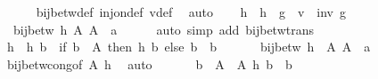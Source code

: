 \begin{isabellebody}
\ \ \ \ \isamarkupfalse%
\ bij{\isacharunderscore}{\kern0pt}betw{\isacharunderscore}{\kern0pt}def\ inj{\isacharunderscore}{\kern0pt}on{\isacharunderscore}{\kern0pt}def\ v{\isacharunderscore}{\kern0pt}def\ \isamarkupfalse%
\ auto\isanewline
\ \ \isamarkupfalse%
\ h{\isacharprime}{\kern0pt}\ \ {\isachardoublequoteopen}h{\isacharprime}{\kern0pt}\ {\isacharequal}{\kern0pt}\ g\ {\isasymcirc}\ v\ {\isasymcirc}\ {\isacharparenleft}{\kern0pt}inv\ g{\isacharparenright}{\kern0pt}{\isachardoublequoteclose}\isanewline
\ \ \isamarkupfalse%
\ {}\ {}\ {}\ \isamarkupfalse%
\ {}{\isacharcolon}{\kern0pt}\ {\isachardoublequoteopen}bij{\isacharunderscore}{\kern0pt}betw\ h{\isacharprime}{\kern0pt}\ A{\isacharprime}{\kern0pt}\ {\isacharparenleft}{\kern0pt}A{\isacharprime}{\kern0pt}\ {\isacharminus}{\kern0pt}\ {\isacharbraceleft}{\kern0pt}a{\isacharbraceright}{\kern0pt}{\isacharparenright}{\kern0pt}{\isachardoublequoteclose}\isanewline
\ \ \ \ \isamarkupfalse%
\ {\isacharparenleft}{\kern0pt}auto\ simp\ add{\isacharcolon}{\kern0pt}\ bij{\isacharunderscore}{\kern0pt}betw{\isacharunderscore}{\kern0pt}trans{\isacharparenright}{\kern0pt}\isanewline
\ \ \isamarkupfalse%
\ h\ \ {\isachardoublequoteopen}h\ b\ {\isacharequal}{\kern0pt}\ {\isacharparenleft}{\kern0pt}if\ b\ {\isasymin}\ A{\isacharprime}{\kern0pt}\ then\ h{\isacharprime}{\kern0pt}\ b\ else\ b{\isacharparenright}{\kern0pt}{\isachardoublequoteclose}\ \ b\isanewline
\ \ \isamarkupfalse%
\ {}\ \isamarkupfalse%
\ {\isachardoublequoteopen}bij{\isacharunderscore}{\kern0pt}betw\ h\ \ A{\isacharprime}{\kern0pt}\ {\isacharparenleft}{\kern0pt}A{\isacharprime}{\kern0pt}\ {\isacharminus}{\kern0pt}\ {\isacharbraceleft}{\kern0pt}a{\isacharbraceright}{\kern0pt}{\isacharparenright}{\kern0pt}{\isachardoublequoteclose}\isanewline
\ \ \ \ \isamarkupfalse%
\ bij{\isacharunderscore}{\kern0pt}betw{\isacharunderscore}{\kern0pt}cong{\isacharbrackleft}{\kern0pt}of\ A{\isacharprime}{\kern0pt}\ h{\isacharbrackright}{\kern0pt}\ \isamarkupfalse%
\ auto\isanewline
\ \ \isamarkupfalse%
\isanewline
\ \ \isamarkupfalse%
\ {\isachardoublequoteopen}{\isasymforall}b\ {\isasymin}\ A\ {\isacharminus}{\kern0pt}\ A{\isacharprime}{\kern0pt}{\isachardot}{\kern0pt}\ h\ b\ {\isacharequal}{\kern0pt}\ b{\isachardoublequoteclose}\ \isamarkupfalse%

\end{isabellebody}
